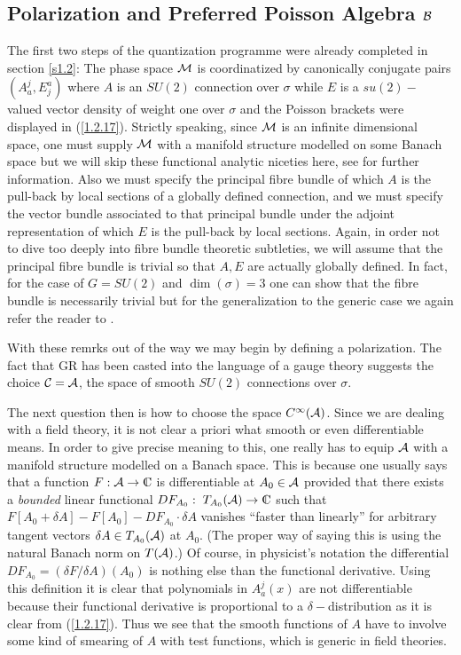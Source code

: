 \documentclass[12pt]{report}
\def\a{{\cal A}}
\def\Cl{{\mathchoice
{\setbox0=\hbox{$\displaystyle\rm C$}\hbox{\hbox to0pt
{\kern0.4\wd0\vrule height0.9\ht0\hss}\box0}}
{\setbox0=\hbox{$\textstyle\rm C$}\hbox{\hbox to0pt
{\kern0.4\wd0\vrule height0.9\ht0\hss}\box0}}
{\setbox0=\hbox{$\scriptstyle\rm C$}\hbox{\hbox to0pt
{\kern0.4\wd0\vrule height0.9\ht0\hss}\box0}}
{\setbox0=\hbox{$\scriptscriptstyle\rm C$}\hbox{\hbox to0pt
{\kern0.4\wd0\vrule height0.9\ht0\hss}\box0}}}}
\begin{document}
\subsection{Polarization and Preferred Poisson Algebra $\cal B$}
\label{s2.1.1}

The first two steps of the quantization programme were already completed 
in section \ref{s1.2}: The phase space $\cal M$ is coordinatized by
canonically conjugate pairs $(A_a^j,E^a_j)$ where $A$ is an $SU(2)$
connection over $\sigma$ while $E$ is a $su(2)-$valued vector density of 
weight one over $\sigma$ and the Poisson brackets were 
displayed in (\ref{1.2.17}). Strictly speaking, since $\cal M$
is an infinite dimensional space, one must supply $\cal M$ with
a manifold structure modelled on some Banach space but we will skip these
functional analytic niceties here, see \cite{0} for further information.
Also we must specify the principal fibre bundle of which $A$ is the 
pull-back by local sections of a globally defined connection, and we must
specify the vector bundle associated to that principal bundle under the 
adjoint representation of which $E$ is the pull-back by local sections.
Again, in order not to dive too deeply into fibre bundle theoretic 
subtleties, we will assume that the principal fibre bundle is trivial
so that $A,E$ are actually globally defined. In fact, for the case of 
$G=SU(2)$ and $\dim(\sigma)=3$ one can show that the fibre bundle is 
necessarily trivial but for the generalization to the generic case we 
again refer the reader to \cite{0}.

With these remrks out of the way we may begin by defining a polarization.
The fact that GR has been casted into the language of a gauge theory 
suggests the choice ${\cal C}=\a$, the space of smooth $SU(2)$ connections 
over $\sigma$. 
  
The next question then is how to choose the space $C^\infty(\a)$. 
Since we are dealing with a field theory, it is not clear a priori
what smooth or even differentiable means. In order to give precise meaning
to this, one really has to equip $\a$ with a manifold structure modelled
on a Banach space. This is because one usually says that a function
$F:\a\to \Cl$ is differentiable at $A_0\in \a$ provided that
there exists a {\it bounded} linear functional 
$DF_{A_0}:\; T_{A_0}(\a)\to \Cl$
such that $F[A_0+\delta A]-F[A_0]-DF_{A_0}\cdot \delta A$ vanishes 
``faster than linearly'' for arbitrary tangent vectors 
$\delta A\in T_{A_0}(\a)$ at $A_0$. (The proper way of saying this is 
using the natural Banach norm on $T(\a)$.) Of course, in physicist's 
notation the differential $DF_{A_0}=(\delta F/\delta A)(A_0)$ is nothing
else than the functional derivative. Using this definition 
it is clear that polynomials in $A_a^j(x)$ are not differentiable
because their functional derivative is proportional to a 
$\delta-$distribution as it is clear from (\ref{1.2.17}). Thus we see
that the smooth functions of $A$ have to involve some kind of smearing 
of $A$ with test functions, which is generic in field theories.
\end{document}
